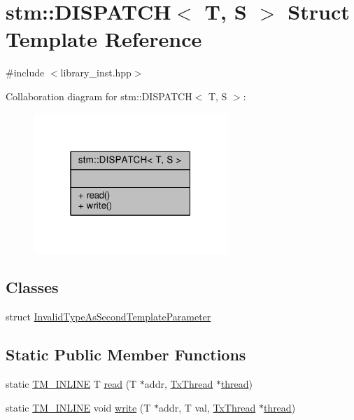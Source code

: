 \hypertarget{structstm_1_1DISPATCH}{\section{stm\-:\-:D\-I\-S\-P\-A\-T\-C\-H$<$ T, S $>$ Struct Template Reference}
\label{structstm_1_1DISPATCH}
}


{\ttfamily \#include $<$library\-\_\-inst.\-hpp$>$}



Collaboration diagram for stm\-:\-:D\-I\-S\-P\-A\-T\-C\-H$<$ T, S $>$\-:
\nopagebreak
\begin{figure}[H]
\begin{center}
\leavevmode
\includegraphics[width=208pt]{structstm_1_1DISPATCH__coll__graph}
\end{center}
\end{figure}
\subsection*{Classes}
\begin{DoxyCompactItemize}
\item 
struct \hyperlink{structstm_1_1DISPATCH_1_1InvalidTypeAsSecondTemplateParameter}{Invalid\-Type\-As\-Second\-Template\-Parameter}
\end{DoxyCompactItemize}
\subsection*{Static Public Member Functions}
\begin{DoxyCompactItemize}
\item 
static \hyperlink{platform_8hpp_abdc8d70d196a73a2a119efdbe674ecf8}{T\-M\-\_\-\-I\-N\-L\-I\-N\-E} T \hyperlink{structstm_1_1DISPATCH_a30476d40ef29d1b3cb5109b666a9fc3c}{read} (T $\ast$addr, \hyperlink{structstm_1_1TxThread}{Tx\-Thread} $\ast$\hyperlink{classthread}{thread})
\item 
static \hyperlink{platform_8hpp_abdc8d70d196a73a2a119efdbe674ecf8}{T\-M\-\_\-\-I\-N\-L\-I\-N\-E} void \hyperlink{structstm_1_1DISPATCH_afb6772f0e520bb34d0b8bb0744d68dd5}{write} (T $\ast$addr, T val, \hyperlink{structstm_1_1TxThread}{Tx\-Thread} $\ast$\hyperlink{classthread}{thread})
\end{DoxyCompactItemize}


